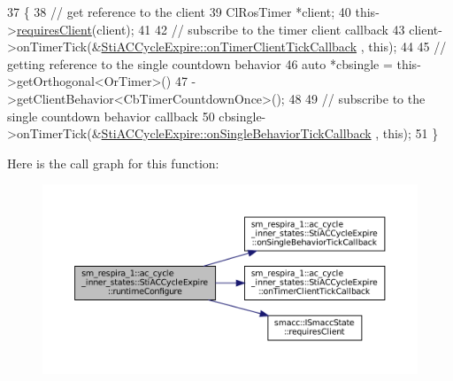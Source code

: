 \begin{DoxyCode}
37   \{
38     \textcolor{comment}{// get reference to the client}
39     ClRosTimer *client;
40     this->\hyperlink{classsmacc_1_1ISmaccState_a7f95c9f0a6ea2d6f18d1aec0519de4ac}{requiresClient}(client);
41 
42     \textcolor{comment}{// subscribe to the timer client callback}
43     client->onTimerTick(&\hyperlink{structsm__respira__1_1_1ac__cycle__inner__states_1_1StiACCycleExpire_a9f01d2f0b1003702adfb6dbac0a75e8d}{StiACCycleExpire::onTimerClientTickCallback}
      , \textcolor{keyword}{this});
44 
45     \textcolor{comment}{// getting reference to the single countdown behavior}
46     \textcolor{keyword}{auto} *cbsingle = this->getOrthogonal<OrTimer>()
47                           ->getClientBehavior<CbTimerCountdownOnce>();
48 
49     \textcolor{comment}{// subscribe to the single countdown behavior callback}
50     cbsingle->onTimerTick(&\hyperlink{structsm__respira__1_1_1ac__cycle__inner__states_1_1StiACCycleExpire_abf27619c790ae390ba117175408dff54}{StiACCycleExpire::onSingleBehaviorTickCallback}
      , \textcolor{keyword}{this});
51   \}
\end{DoxyCode}
Here is the call graph for this function\+:
\nopagebreak
\begin{figure}[H]
\begin{center}
\leavevmode
\includegraphics[width=350pt]{structsm__respira__1_1_1ac__cycle__inner__states_1_1StiACCycleExpire_a53776f163d9983ec3d4104b858d77eb0_cgraph}
\end{center}
\end{figure}
\mbox{\label{structsm__respira__1_1_1ac__cycle__inner__states_1_1StiACCycleExpire_a82bfd9279d2e10b9d9815310fe29e14d}} 
